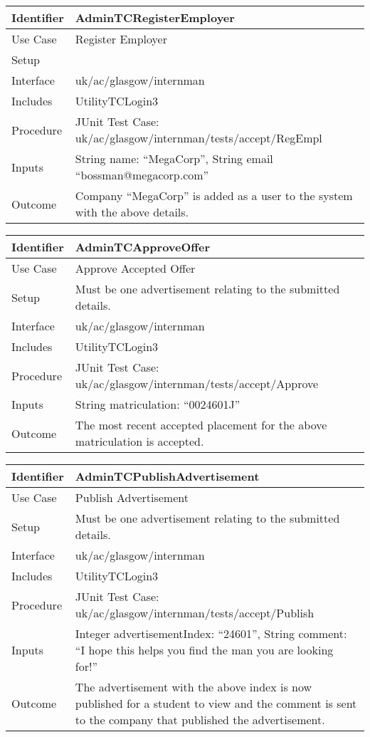 \vspace{2em}
\begin{tabularx}{\textwidth}{|T|L|}
\hline
Identifier & AdminTCRegisterEmployer\\
\hline
Use Case & Register Employer\\
\hline
Setup & \\
\hline
Interface & uk/ac/glasgow/internman\\
\hline
Includes & UtilityTCLogin3\\
\hline
Procedure & JUnit Test Case: uk/ac/glasgow/internman/tests/accept/RegEmpl\\
\hline
Inputs & String name: ``MegaCorp'', String email ``bossman@megacorp.com''\\
\hline
Outcome & Company ``MegaCorp'' is added as a user to the system with
the above details.\\
\hline
\end{tabularx}
\vspace{2em}
\begin{tabularx}{\textwidth}{|T|L|}
\hline
Identifier & AdminTCApproveOffer\\
\hline
Use Case & Approve Accepted Offer\\
\hline
Setup & Must be one advertisement relating to the submitted details.\\
\hline
Interface & uk/ac/glasgow/internman\\
\hline
Includes & UtilityTCLogin3\\
\hline
Procedure & JUnit Test Case: uk/ac/glasgow/internman/tests/accept/Approve\\
\hline
Inputs & String matriculation: ``0024601J''\\
\hline
Outcome & The most recent accepted placement for the above
matriculation is accepted.\\
\hline
\end{tabularx}
\vspace{2em}
\begin{tabularx}{\textwidth}{|T|L|}
\hline
Identifier & AdminTCPublishAdvertisement\\
\hline
Use Case & Publish Advertisement\\
\hline
Setup & Must be one advertisement relating to the submitted details.\\
\hline
Interface & uk/ac/glasgow/internman\\
\hline
Includes & UtilityTCLogin3\\
\hline
Procedure & JUnit Test Case: uk/ac/glasgow/internman/tests/accept/Publish\\
\hline
Inputs & Integer advertisementIndex: ``24601'', String comment:
``I hope this helps you find the man you are looking for!''\\
\hline
Outcome & The advertisement with the above index is now published for
a student to view and the comment is sent to the company that
published the advertisement.\\
\hline
\end{tabularx}
